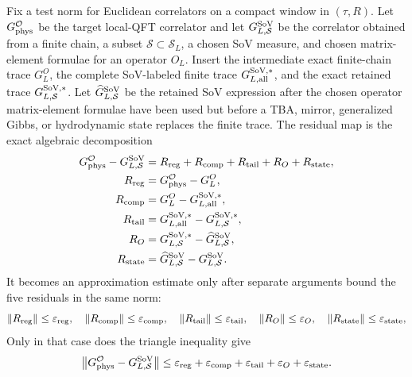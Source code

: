 \begin{remark}
\label{rem:sov-observable-reconstruction-map}
Fix a test norm for Euclidean correlators on a compact window in
\((\tau,R)\).  Let \(G_{\rm phys}^{\mathcal O}\) be the target local-QFT
correlator and let \(G_{L,\mathcal S}^{\rm SoV}\) be the correlator obtained
from a finite chain, a subset \(\mathcal S\subset\mathcal S_L\), a chosen SoV
measure, and chosen matrix-element formulae for an operator \(O_L\).  Insert
the intermediate exact finite-chain trace \(G_L^{O}\), the complete
SoV-labeled finite trace \(G_{L,\rm all}^{\rm SoV,*}\), and the exact
retained trace \(G_{L,\mathcal S}^{\rm SoV,*}\).  Let
\(\widehat G_{L,\mathcal S}^{\rm SoV}\) be the retained SoV expression after
the chosen operator matrix-element formulae have been used but before a TBA,
mirror, generalized Gibbs, or hydrodynamic state replaces the finite trace.
The residual map is the exact algebraic decomposition
\begin{align}
  G_{\rm phys}^{\mathcal O}-G_{L,\mathcal S}^{\rm SoV}
  &=
  R_{\rm reg}
  +R_{\rm comp}
  +R_{\rm tail}
  +R_{O}
  +R_{\rm state},
  \label{eq:sov-observable-reconstruction-residual-decomposition}\\
  R_{\rm reg}
  &=
  G_{\rm phys}^{\mathcal O}-G_L^{O},\nonumber\\
  R_{\rm comp}
  &=
  G_L^{O}-G_{L,\rm all}^{\rm SoV,*},\nonumber\\
  R_{\rm tail}
  &=
  G_{L,\rm all}^{\rm SoV,*}-G_{L,\mathcal S}^{\rm SoV,*},\nonumber\\
  R_{O}
  &=
  G_{L,\mathcal S}^{\rm SoV,*}
  -\widehat G_{L,\mathcal S}^{\rm SoV},\nonumber\\
  R_{\rm state}
  &=
  \widehat G_{L,\mathcal S}^{\rm SoV}
  -G_{L,\mathcal S}^{\rm SoV}.\nonumber
\end{align}
It becomes an approximation estimate only after separate arguments bound the
five residuals in the same norm:
\[
  \|R_{\rm reg}\|\le\varepsilon_{\rm reg},\quad
  \|R_{\rm comp}\|\le\varepsilon_{\rm comp},\quad
  \|R_{\rm tail}\|\le\varepsilon_{\rm tail},\quad
  \|R_O\|\le\varepsilon_O,\quad
  \|R_{\rm state}\|\le\varepsilon_{\rm state},
\]
Only in that case does the triangle inequality give
\begin{equation}
  \left\|
    G_{\rm phys}^{\mathcal O}-G_{L,\mathcal S}^{\rm SoV}
  \right\|
  \le
  \varepsilon_{\rm reg}
  +\varepsilon_{\rm comp}
  +\varepsilon_{\rm tail}
  +\varepsilon_O
  +\varepsilon_{\rm state}.
  \label{eq:sov-observable-reconstruction-conditional-bound}
\end{equation}
\end{remark}

